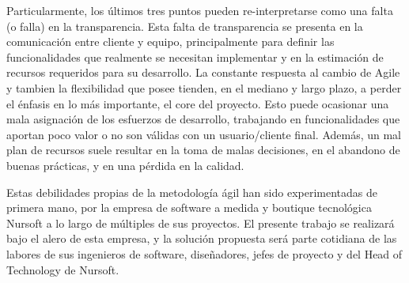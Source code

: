Particularmente, los últimos tres puntos pueden re-interpretarse como una falta 
(o falla) en la transparencia. Esta falta de transparencia se presenta en la 
comunicación entre cliente y equipo, principalmente para definir las 
funcionalidades que realmente se necesitan implementar y en la estimación de 
recursos requeridos para su desarrollo. La constante respuesta al cambio de Agile
y tambien la flexibilidad que posee tienden, en el mediano y largo plazo, 
a perder el énfasis en lo más importante, el core del proyecto. 
Esto puede ocasionar una mala asignación de los esfuerzos de desarrollo, 
trabajando en funcionalidades que aportan poco valor o no son válidas con un 
usuario/cliente final. Además, un mal plan de recursos suele resultar en la toma
de malas decisiones, en el abandono de buenas prácticas, y en una pérdida en la calidad.


Estas debilidades propias de la metodología ágil han sido experimentadas de 
primera mano, por la empresa de software a medida y boutique tecnológica Nursoft \cite{nursoft}
a lo largo de múltiples de sus proyectos. El presente trabajo se realizará bajo 
el alero de esta empresa, y la solución propuesta será parte cotidiana de las labores
de sus ingenieros de software, diseñadores, jefes de proyecto y del Head of 
Technology de Nursoft.